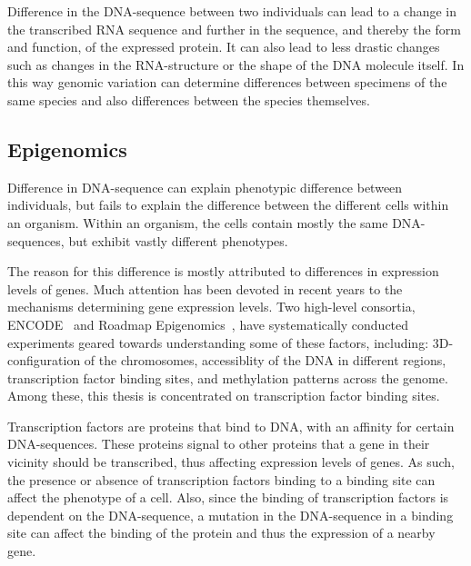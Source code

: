 Difference in the DNA-sequence between two individuals can lead to a change in the transcribed RNA sequence and further in the sequence, and thereby the form and function, of the expressed protein.
It can also lead to less drastic changes such as changes in the RNA-structure or the shape of the DNA molecule itself.
In this way genomic variation can determine differences between specimens of the same species and also differences between the species themselves.

\subsection{Epigenomics}
Difference in DNA-sequence can explain phenotypic
difference between individuals, but fails to explain the difference between the different cells within an organism.
Within an organism, the cells contain mostly the same DNA-sequences, but exhibit vastly different phenotypes.

The reason for this difference is mostly attributed to differences in expression levels of genes.
Much attention has been devoted in recent years to the mechanisms determining gene expression levels.
Two high-level consortia, ENCODE~\cite{encode} and Roadmap Epigenomics~\cite{roadmap}, have systematically conducted experiments geared towards understanding some of these factors, including: 3D-configuration of the chromosomes, accessiblity of the DNA in different regions, transcription factor binding sites, and methylation patterns across the genome.
Among these, this thesis is concentrated on transcription factor binding sites.

Transcription factors are proteins that bind to DNA, with an affinity for certain DNA-sequences.
These proteins signal to other proteins that a gene in their vicinity should be transcribed, thus affecting expression levels of genes.
As such, the presence or absence of transcription factors binding to a binding site can affect the phenotype of a cell.
Also, since the binding of transcription factors is dependent on the DNA-sequence, a mutation in the DNA-sequence in a binding site can affect the binding of the protein and thus the expression of a nearby gene. 


